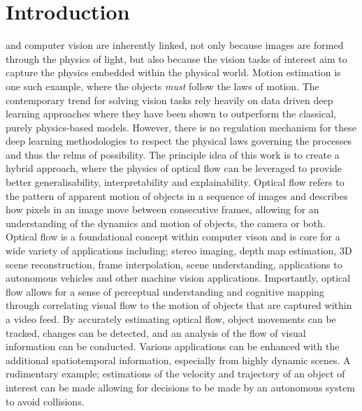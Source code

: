 \section{Introduction}\label{sec:intro}

 and computer vision are inherently linked, not only because images are formed through the physics of light, but also because the vision tasks of interest aim to capture the physics embedded within the physical world. Motion estimation is one such example, where the objects \textit{must} follow the laws of motion. The contemporary trend for solving vision tasks rely heavily on data driven deep learning approaches where they have been shown to outperform the classical, purely physics-based models. However, there is no regulation mechanism for these deep learning methodologies to respect the physical laws governing the processes and thus the relms of possibility. The principle idea of this work is to create a hybrid approach, where the physics of optical flow can be leveraged to provide better generalisability, interpretability and explainability.
\IEEEPARstart{}{} Optical flow refers to the pattern of apparent motion of objects in a sequence of images and describes how pixels in an image move between consecutive frames, allowing for an understanding of the dynamics and motion of objects, the camera or both. Optical flow is a foundational concept within computer vison and is core for a wide variety of applications including; stereo imaging, depth map estimation, 3D scene reconstruction, frame interpolation, scene understanding, applications to autonomous vehicles and other machine vision applications.
\IEEEPARstart{}{} Importantly, optical flow allows for a sense of perceptual understanding and cognitive mapping through correlating visual flow to the motion of objects that are captured within a video feed. By accurately estimating optical flow, object movements can be tracked, changes can be detected, and an analysis of the flow of visual information can be conducted. Various applications can be enhanced with the additional spatiotemporal information, especially from highly dynamic scenes. A rudimentary example; estimations of the velocity and trajectory of an object of interest can be made allowing for decisions to be made by an autonomous system to avoid collisions.
